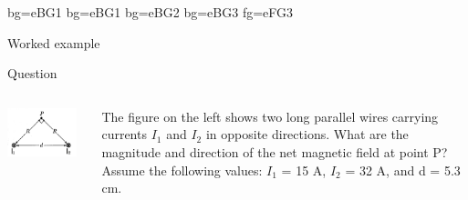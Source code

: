 


%
%

{
 {bg=eBG1}
 {bg=eBG1}
 {bg=eBG2}
 {bg=eBG3}
 {fg=eFG3}

%
%
%

\begin{frame}{Worked example}

\begin{blockexmplque}{Question}

\begin{columns}
  \begin{column}{0.35\textwidth}
    \begin{center}
      \includegraphics[width=0.92\textwidth]{./images/problems/lect5_Bfield_2wires.png}\\
    \end{center}
  \end{column}
  \begin{column}{0.65\textwidth}
    {\small
       The figure on the left shows two long parallel wires carrying
       currents $I_1$ and $I_2$ in opposite directions.
       What are the magnitude and direction of the net magnetic field
       at point P? \\
       Assume the following values:  $I_1$ = 15 A,  $I_2$
       = 32 A, and d = 5.3 cm.\\
    }
  \end{column}
\end{columns}
\end{blockexmplque}


\end{frame}}
